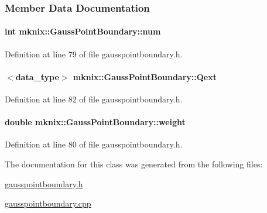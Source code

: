 \subsubsection{Member Data Documentation}
\hypertarget{classmknix_1_1_gauss_point_boundary_a372aae851a09ae56adbf636aa3e2840f}{}
\paragraph[{num}]{\setlength{\rightskip}{0pt plus 5cm}int mknix\+::\+Gauss\+Point\+Boundary\+::num\hspace{0.3cm}{\ttfamily [protected]}}\label{classmknix_1_1_gauss_point_boundary_a372aae851a09ae56adbf636aa3e2840f}


Definition at line 79 of file gausspointboundary.\+h.

\hypertarget{classmknix_1_1_gauss_point_boundary_a7dcc50dbaeface891d0658b4ead424f7}{}
\paragraph[{Qext}]{$<${\bf data\+\_\+type}$>$ mknix\+::\+Gauss\+Point\+Boundary\+::\+Qext\hspace{0.3cm}{\ttfamily [protected]}}\label{classmknix_1_1_gauss_point_boundary_a7dcc50dbaeface891d0658b4ead424f7}


Definition at line 82 of file gausspointboundary.\+h.

\hypertarget{classmknix_1_1_gauss_point_boundary_a2c17d0b362d6a658ef01f69f0d2baa17}{}
\paragraph[{weight}]{\setlength{\rightskip}{0pt plus 5cm}double mknix\+::\+Gauss\+Point\+Boundary\+::weight\hspace{0.3cm}{\ttfamily [protected]}}\label{classmknix_1_1_gauss_point_boundary_a2c17d0b362d6a658ef01f69f0d2baa17}


Definition at line 80 of file gausspointboundary.\+h.



The documentation for this class was generated from the following files\+:\begin{DoxyCompactItemize}
\item 
\hyperlink{gausspointboundary_8h}{gausspointboundary.\+h}\item 
\hyperlink{gausspointboundary_8cpp}{gausspointboundary.\+cpp}\end{DoxyCompactItemize}
